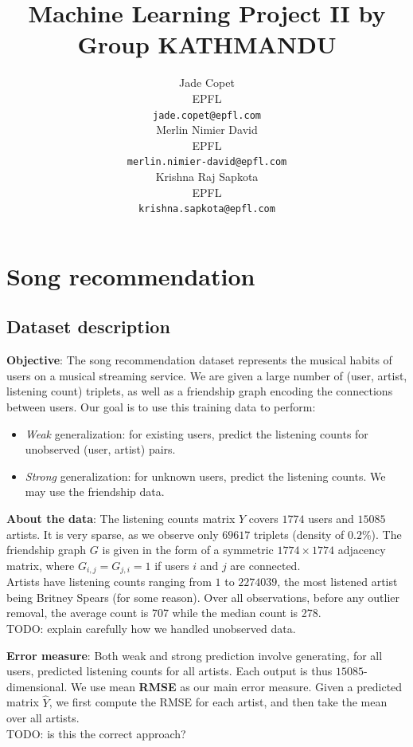 \documentclass{article}
\title{Machine Learning Project II by Group KATHMANDU}
\author{
  Jade Copet\\
  EPFL \\
  \texttt{jade.copet@epfl.com} \\
  \And
  Merlin Nimier David\\
  EPFL \\
  \texttt{merlin.nimier-david@epfl.com} \\
  \And
  Krishna Raj Sapkota\\
  EPFL \\
  \texttt{krishna.sapkota@epfl.com} \\
}
\begin{document}
\maketitle



\begin{abstract}
\end{abstract}



\section{Song recommendation}

  \subsection{Dataset description}
  \textbf{Objective}: The song recommendation dataset represents the musical habits of users on a musical streaming service. We are given a large number of (user, artist, listening count) triplets, as well as a friendship graph encoding the connections between users. Our goal is to use this training data to perform:

  \begin{itemize}
    \item \textit{Weak} generalization: for existing users, predict the listening counts for unobserved (user, artist) pairs.
    \item \textit{Strong} generalization: for unknown users, predict the listening counts. We may use the friendship data.
  \end{itemize}

  \textbf{About the data}: The listening counts matrix $Y$ covers $1774$ users and $15085$ artists. It is very sparse, as we observe only $69617$ triplets (density of $0.2\%$). The friendship graph $G$ is given in the form of a symmetric $1774 \times 1774$ adjacency matrix, where $G_{i, j} = G_{j, i} = 1$ if users $i$ and $j$ are connected.\\

  Artists have listening counts ranging from $1$ to $2274039$, the most listened artist being Britney Spears (for some reason). Over all observations, before any outlier removal, the average count is 707 while the median count is 278.\\

  TODO: explain carefully how we handled unobserved data.

  \textbf{Error measure}: Both weak and strong prediction involve generating, for all users, predicted listening counts for all artists. Each output is thus $15085$-dimensional. We use mean \textbf{RMSE} as our main error measure. Given a predicted matrix $\hat{Y}$, we first compute the RMSE for each artist, and then take the mean over all artists.\\
  TODO: is this the correct approach?
\end{document}
